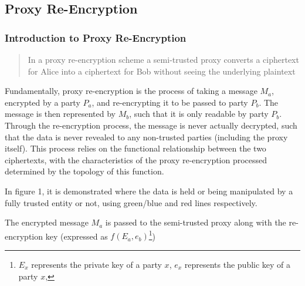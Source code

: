 \subsection{Proxy Re-Encryption}

\subsubsection{Introduction to Proxy Re-Encryption}

\blockquote{In a proxy re-encryption scheme a semi-trusted proxy converts a ciphertext for Alice into a ciphertext for Bob without seeing the underlying plaintext}\autocite{greenateniese:2006:article}

Fundamentally, proxy re-encryption is the process of taking a message $M_a$, encrypted by a party $P_a$, and re-encrypting it to be passed to party $P_b$. The message is then represented by $M_b$, such that it is only readable by party $P_b$. Through the re-encryption process, the message is never actually decrypted, such that the data is never revealed to any non-trusted parties (including the proxy itself). This process relies on the functional relationship between the two ciphertexts, with the characteristics of the proxy re-encryption processed determined by the topology of this function.



In figure 1, it is demonstrated where the data is held or being manipulated by a fully trusted entity or not, using green/blue and red lines respectively.

The encrypted message $M_a$ is passed to the semi-trusted proxy along with the re-encryption key (expressed as $f(E_a, e_b)$\footnote{$E_x$ represents the private key of a party $x$, $e_x$ represents the public key of a party $x$,})



